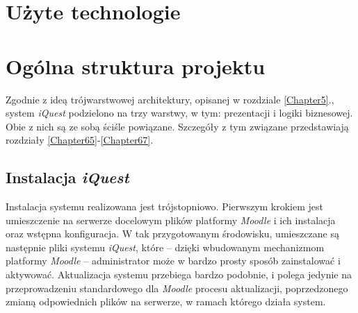 \section{Użyte technologie}
\label{Chapter63}




\section{Ogólna struktura projektu}
\label{Chapter64}

Zgodnie z ideą trójwarstwowej architektury, opisanej w rozdziale \ref{Chapter5}., system \textit{iQuest} podzielono na trzy warstwy, w tym: prezentacji i logiki biznesowej. Obie z nich są ze sobą ściśle powiązane. Szczegóły z tym związane przedstawiają rozdziały \ref{Chapter65}-\ref{Chapter67}.





\subsection{Instalacja \textit{iQuest}}
\label{Chapter68}
Instalacja systemu realizowana jest trójstopniowo. Pierwszym krokiem jest umieszczenie na serwerze docelowym plików platformy \textit{Moodle} i ich instalacja oraz wstępna konfiguracja. W tak przygotowanym środowisku, umieszczane są następnie pliki systemu \textit{iQuest}, które -- dzięki wbudowanym mechanizmom platformy \textit{Moodle} -- administrator może w bardzo prosty sposób zainstalować i aktywować. Aktualizacja systemu przebiega bardzo podobnie, i polega jedynie na przeprowadzeniu standardowego dla \textit{Moodle} procesu aktualizacji, poprzedzonego zmianą odpowiednich plików na serwerze, w ramach którego działa system.